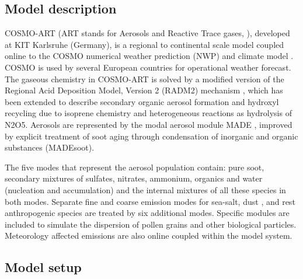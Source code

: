 \subsection{Model description}
\label{subsec:1.1}

COSMO-ART  (ART   stands  for  Aerosols  and   Reactive  Trace  gases,
\citealp{Vogel-2009}),  developed  at KIT  Karlsruhe  (Germany), is  a
regional  to  continental scale  model  coupled  online  to the  COSMO
numerical    weather    prediction    (NWP)    and    climate    model
\citep{Baldauf-2011}. COSMO is used  by several European countries for
operational weather  forecast. The  gaseous chemistry in  COSMO-ART is
solved by  a modified version  of the Regional Acid  Deposition Model,
Version  2 (RADM2)  mechanism \citep{Stockwell-1990},  which  has been
extended   to    describe   secondary   organic    aerosol   formation
\citep{Schell-2001, Athanasopoulou-2013} and hydroxyl recycling due to
isoprene chemistry \citep{Geiger-2003}  and heterogeneous reactions as
hydrolysis  of N2O5.  Aerosols are  represented by  the  modal aerosol
module MADE \citep{Ackermann-1998},  improved by explicit treatment of
soot aging  through condensation of  inorganic \citep{Riemer-2003} and
organic substances (MADEsoot).

The  five modes that  represent the  aerosol population  contain: pure
soot, secondary mixtures of sulfates, nitrates, ammonium, organics and
water (nucleation  and accumulation) and the internal  mixtures of all
these species in  both modes. Separate fine and  coarse emission modes
for  sea-salt,  dust  \citep{Stanelle-2010},  and  rest  anthropogenic
species  are treated by  six additional  modes.  Specific  modules are
included    to   simulate    the   dispersion    of    pollen   grains
\citep{Vogel-2008}   and  other  biological   particles.   Meteorology
affected emissions are also online coupled within the model system.

\subsection{Model setup}
\label{subsec:1.2}
